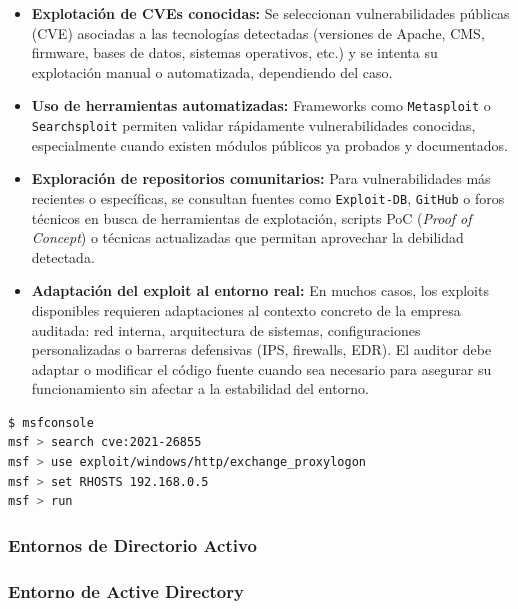 \documentclass[a4paper, 11pt]{article}
\begin{document}
\begin{itemize}

    \item \textbf{Explotación de CVEs conocidas:} Se seleccionan vulnerabilidades públicas (CVE) asociadas a las tecnologías detectadas (versiones de Apache, CMS, firmware, bases de datos, sistemas operativos, etc.) y se intenta su explotación manual o automatizada, dependiendo del caso.

    \item \textbf{Uso de herramientas automatizadas:} Frameworks como \texttt{Metasploit} o \texttt{Searchsploit} permiten validar rápidamente vulnerabilidades conocidas, especialmente cuando existen módulos públicos ya probados y documentados.

    \item \textbf{Exploración de repositorios comunitarios:} Para vulnerabilidades más recientes o específicas, se consultan fuentes como \texttt{Exploit-DB}, \texttt{GitHub} o foros técnicos en busca de herramientas de explotación, scripts PoC (\textit{Proof of Concept}) o técnicas actualizadas que permitan aprovechar la debilidad detectada.

    \item \textbf{Adaptación del exploit al entorno real:} En muchos casos, los exploits disponibles requieren adaptaciones al contexto concreto de la empresa auditada: red interna, arquitectura de sistemas, configuraciones personalizadas o barreras defensivas (IPS, firewalls, EDR). El auditor debe adaptar o modificar el código fuente cuando sea necesario para asegurar su funcionamiento sin afectar a la estabilidad del entorno.
\end{itemize}

\begin{lstlisting}[language=bash, style=terminalstyle, caption=Ejemplo básico de uso de Metasploit para explotación de CVE]
$ msfconsole
msf > search cve:2021-26855
msf > use exploit/windows/http/exchange_proxylogon
msf > set RHOSTS 192.168.0.5
msf > run
\end{lstlisting}




\subsubsection{Entornos de Directorio Activo}
\label{sec:ad}

\subsubsection*{Entorno de Active Directory}
\end{document}
